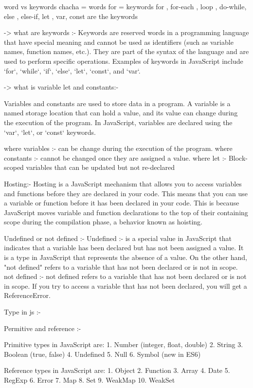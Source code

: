 word vs keywords 
chacha = words
for =  keywords 
for , for-each , loop , do-while, else , else-if,
let , var, const are the keywords 

-> what are keywords :-
Keywords are reserved words in a programming language that have special meaning and cannot be used as identifiers (such as variable names, function names, etc.). They are part of the syntax of the language and are used to perform specific operations. Examples of keywords in JavaScript include `for`, `while`, `if`, `else`, `let`, `const`, and `var`.

-> what is variable let and constants:-

Variables and constants are used to store data in a program. A variable is a named storage location that can hold a value, and its value can change during the execution of the program. In JavaScript, variables are declared using the `var`, `let`, or `const` keywords.

 where variables :- can be change during the execution of the program.
 where constants :- cannot be changed once they are assigned a value.
 where let :- 
 Block-scoped variables that can be updated but not re-declared 

Hosting:-
Hosting is a JavaScript mechanism that allows you to access variables and functions before they are declared in your code. This means that you can use a variable or function before it has been declared in your code. This is because JavaScript moves variable and function declarations to the top of their containing scope during the compilation phase, a behavior known as hoisting.

Undefined or not defined :-
Undefined :- is a special value in JavaScript that indicates that a variable has been declared but has not been assigned a value. It is a type in JavaScript that represents the absence of a value. On the other hand, "not defined" refers to a variable that has not been declared or is not in scope.
not defined :-
not defined refers to a variable that has not been declared or is not in scope. If you try to access a variable that has not been declared, you will get a ReferenceError.

Type in js :- 

Permitive and reference :-

Primitive types in JavaScript are:
1. Number (integer, float, double)
2. String
3. Boolean (true, false)
4. Undefined
5. Null
6. Symbol (new in ES6)

Reference types in JavaScript are:
1. Object
2. Function
3. Array
4. Date
5. RegExp
6. Error
7. Map
8. Set
9. WeakMap
10. WeakSet

